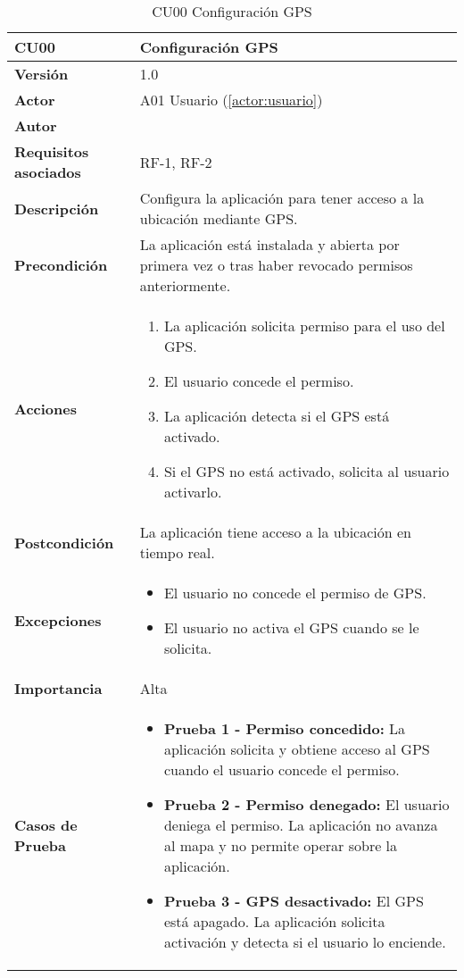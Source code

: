 \begin{table}[H]
	\centering
	\begin{tabularx}{\linewidth}{ p{} p{} }
		\toprule
		\textbf{CU00}    & \textbf{Configuración GPS} \\
		\toprule
		\textbf{Versión}              & 1.0    \\
		\textbf{Actor}                & A01 Usuario (\ref{actor:usuario}) \\
		\textbf{Autor}                & \autor \\
		\textbf{Requisitos asociados} & RF-1, RF-2 \\
		\textbf{Descripción}          & Configura la aplicación para tener acceso a la ubicación mediante GPS. \\
		\textbf{Precondición}         & La aplicación está instalada y abierta por primera vez o tras haber revocado permisos anteriormente. \\
		\textbf{Acciones}             &
		\begin{enumerate}
			\def\labelenumi{\arabic{enumi}.}
			\tightlist
			\item La aplicación solicita permiso para el uso del GPS.
			\item El usuario concede el permiso.
			\item La aplicación detecta si el GPS está activado.
			\item Si el GPS no está activado, solicita al usuario activarlo.
		\end{enumerate}\\
		\textbf{Postcondición}        & La aplicación tiene acceso a la ubicación en tiempo real. \\
		\textbf{Excepciones}          & 
		\begin{itemize}
			\tightlist
			\item El usuario no concede el permiso de GPS.
			\item El usuario no activa el GPS cuando se le solicita.
		\end{itemize}\\
		\textbf{Importancia}          & Alta \\
		\textbf{Casos de Prueba}      & 
		\begin{itemize}
			\tightlist
			\item \textbf{Prueba 1 - Permiso concedido:} La aplicación solicita y obtiene acceso al GPS cuando el usuario concede el permiso.\vspace{2pt}
			\item \textbf{Prueba 2 - Permiso denegado:} El usuario deniega el permiso. La aplicación no avanza al mapa y no permite operar sobre la aplicación. \vspace{2pt}
			\item \textbf{Prueba 3 - GPS desactivado:} El GPS está apagado. La aplicación solicita activación y detecta si el usuario lo enciende.
		\end{itemize}\\
		\bottomrule
	\end{tabularx}
	\caption{CU00 Configuración GPS}
\end{table}



